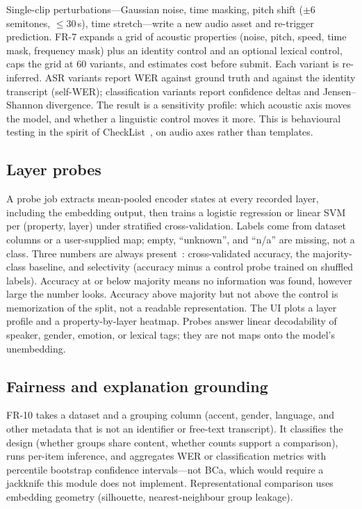 \documentclass[conference]{IEEEtran}
\begin{document}
Single-clip perturbations---Gaussian noise, time masking, pitch shift ($\pm 6$ semitones, $\le 30$\,s), time stretch---write a new audio asset and re-trigger prediction. FR-7 expands a grid of acoustic properties (noise, pitch, speed, time mask, frequency mask) plus an identity control and an optional lexical control, caps the grid at 60 variants, and estimates cost before submit. Each variant is re-inferred. ASR variants report WER against ground truth and against the identity transcript (self-WER); classification variants report confidence deltas and Jensen--Shannon divergence. The result is a sensitivity profile: which acoustic axis moves the model, and whether a linguistic control moves it more. This is behavioural testing in the spirit of CheckList~\cite{ribeiro2020checklist}, on audio axes rather than templates.

\subsection{Layer probes}

A probe job extracts mean-pooled encoder states at every recorded layer, including the embedding output, then trains a logistic regression or linear SVM per (property, layer) under stratified cross-validation. Labels come from dataset columns or a user-supplied map; empty, ``unknown'', and ``n/a'' are missing, not a class. Three numbers are always present~\cite{hewitt2019control,belinkov2022probing}: cross-validated accuracy, the majority-class baseline, and selectivity (accuracy minus a control probe trained on shuffled labels). Accuracy at or below majority means no information was found, however large the number looks. Accuracy above majority but not above the control is memorization of the split, not a readable representation. The UI plots a layer profile and a property-by-layer heatmap. Probes answer linear decodability of speaker, gender, emotion, or lexical tags; they are not maps onto the model's unembedding.

\subsection{Fairness and explanation grounding}

FR-10 takes a dataset and a grouping column (accent, gender, language, and other metadata that is not an identifier or free-text transcript). It classifies the design (whether groups share content, whether counts support a comparison), runs per-item inference, and aggregates WER or classification metrics with percentile bootstrap confidence intervals---not BCa, which would require a jackknife this module does not implement. Representational comparison uses embedding geometry (silhouette, nearest-neighbour group leakage).
\end{document}
